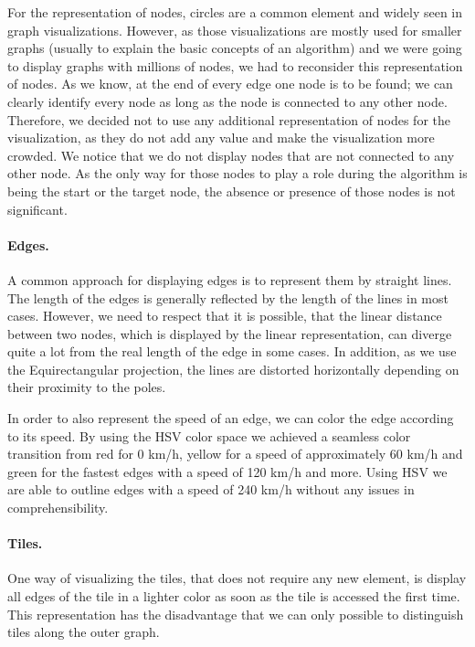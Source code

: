 \documentclass
[
    paper = a4,
    pagesize,
    12 pt,
    twoside,                       %
    open = right,
    DIV = calc,
    BCOR = 0 mm,                   %
    bibtotoc
]
{scrbook}
\begin{document}
For the representation of nodes, circles are a common element and widely seen in graph visualizations.
However, as those visualizations are mostly used for smaller graphs (usually to explain the basic concepts of an algorithm) and we were going to display graphs with millions of nodes, we had to reconsider this representation of nodes.
As we know, at the end of every edge one node is to be found; we can clearly identify every node as long as the node is connected to any other node.
Therefore, we decided not to use any additional representation of nodes for the visualization, as they do not add any value and make the visualization more crowded.
We notice that we do not display nodes that are not connected to any other node.
As the only way for those nodes to play a role during the algorithm is being the start or the target node, the absence or presence of those nodes is not significant.

\paragraph{Edges.}

A common approach for displaying edges is to represent them by straight lines.
The length of the edges is generally reflected by the length of the lines in most cases.
However, we need to respect that it is possible, that the linear distance between two nodes, which is displayed by the linear representation, can diverge quite a lot from the real length of the edge in some cases.
In addition, as we use the Equirectangular projection, the lines are distorted horizontally depending on their proximity to the poles.

In order to also represent the speed of an edge, we can color the edge according to its speed.
By using the HSV color space we achieved a seamless color transition from red for 0 km/h, yellow for a speed of approximately 60 km/h and green for the fastest edges with a speed of 120 km/h and more.
Using HSV we are able to outline edges with a speed of 240 km/h without any issues in comprehensibility.


\paragraph{Tiles.}
One way of visualizing the tiles, that does not require any new element, is display all edges of the tile in a lighter color as soon as the tile is accessed the first time.
This representation has the disadvantage that we can only possible to distinguish tiles along the outer graph.
\end{document}
